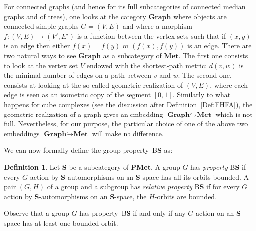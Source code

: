 \documentclass[a4paper]{article}
\theoremstyle{definition}
\newtheorem{defn}[lem]{Definition}
\DeclareMathOperator\Aut{Aut}
\newcommand*{\field}[1]{\mathbf{#1}}
\newcommand*{\category}[1]{\textbf{#1}}
\newcommand*{\PMet}{\category{PMet}}
\newcommand*{\CatS}{\category{S}}
\newcommand*{\Z}{\field{Z}}
\newcommand*{\R}{\field{R}}
\newcommand*{\BS}{B\textbf{S}}
\begin{document}
For connected graphs (and hence for its full subcategories of connected median graphs and of trees), one looks at the category $\category{Graph}$ where objects are connected simple graphs $G=(V,E)$ and where a morphism $f\colon (V,E)\to(V',E')$ is a function between the vertex sets such that if $(x,y)$ is an edge then either $f(x)=f(y)$ or $(f(x),f(y))$ is an edge.
There are two natural ways to see $\category{Graph}$ as a subcategory of $\category{Met}$.
The first one consists to look at the vertex set $V$ endowed with the shortest-path metric: $d(v,w)$ is the minimal number of edges on a path between $v$ and $w$.
The second one, consists at looking at the so called geometric realization of $(V,E)$, where each edge is seen as an isometric copy of the segment $[0,1]$.
Similarly to what happens for cube complexes (see the discussion after Definition~\ref{Def:FHFA}), the geometric realization of a graph gives an embedding $\category{Graph}\hookrightarrow\category{Met}$ which is not full.
Nevertheless, for our purpose, the particular choice of one of the above two embeddings $\category{Graph}\hookrightarrow\category{Met}$ will make no difference.


We can now formally define the group property~\BS{} as:
%
\begin{defn}\label{Def:PropBS}
Let \CatS{} be a subcategory of \PMet.
A group $G$ has \emph{property} \BS{} if every $G$ action by \CatS-automorphisms on an \CatS-space has all its orbits bounded.
A pair $(G,H)$ of a group and a subgroup has \emph{relative property} \BS{} if for every $G$ action by \CatS-automorphisms on an \CatS-space, the $H$-orbits are bounded.
\end{defn}
%
%
Observe that a group $G$ has property~\BS{} if and only if any $G$ action on an \CatS-space has at least one bounded orbit.
\end{document}
